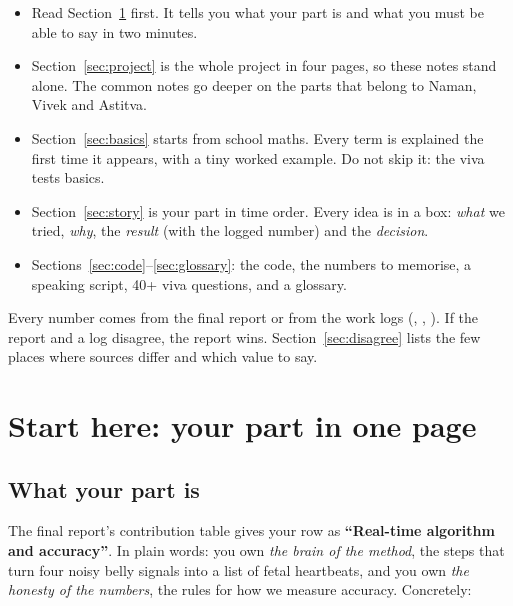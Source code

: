 \documentclass[11pt]{article}
\begin{document}

\begin{simple}
\begin{itemize}
  \item Read Section~\ref{sec:start} first. It tells you what your part is and what you must be able to say in two minutes.
  \item Section~\ref{sec:project} is the whole project in four pages, so these notes stand alone. The common notes  go deeper on the parts that belong to Naman, Vivek and Astitva.
  \item Section~\ref{sec:basics} starts from school maths. Every term is explained the first time it appears, with a tiny worked example. Do not skip it: the viva tests basics.
  \item Section~\ref{sec:story} is your part in time order. Every idea is in a box: \emph{what} we tried, \emph{why}, the \emph{result} (with the logged number) and the \emph{decision}.
  \item Sections~\ref{sec:code}--\ref{sec:glossary}: the code, the numbers to memorise, a speaking script, 40+ viva questions, and a glossary.
\end{itemize}
Every number comes from the final report  or from the work logs (, , ). If the report and a log disagree, the report wins. Section~\ref{sec:disagree} lists the few places where sources differ and which value to say.
\end{simple}

\tableofcontents
\newpage

\section{Start here: your part in one page}
\label{sec:start}

\subsection{What your part is}
The final report's contribution table gives your row as \textbf{``Real-time algorithm and accuracy''}. In plain words: you own \emph{the brain of the method}, the steps that turn four noisy belly signals into a list of fetal heartbeats, and you own \emph{the honesty of the numbers}, the rules for how we measure accuracy. Concretely:
\end{document}
